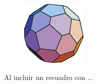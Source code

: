 \documentclass {article}
\begin{document}
\begin{figure}
	\includegraphics{images/ML_fig11.pdf}
\end{figure}
Al incluir un recuadro con ...
\end{document}
